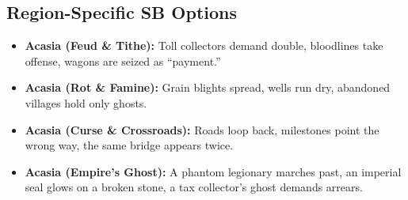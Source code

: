 \subsection*{Region-Specific SB Options}
\begin{itemize}
\item \textbf{Acasia (Feud \& Tithe):} Toll collectors demand double, bloodlines take offense, wagons are seized as ``payment.''
\item \textbf{Acasia (Rot \& Famine):} Grain blights spread, wells run dry, abandoned villages hold only ghosts.
\item \textbf{Acasia (Curse \& Crossroads):} Roads loop back, milestones point the wrong way, the same bridge appears twice.
\item \textbf{Acasia (Empire's Ghost):} A phantom legionary marches past, an imperial seal glows on a broken stone, a tax collector's ghost demands arrears.
\end{itemize}

